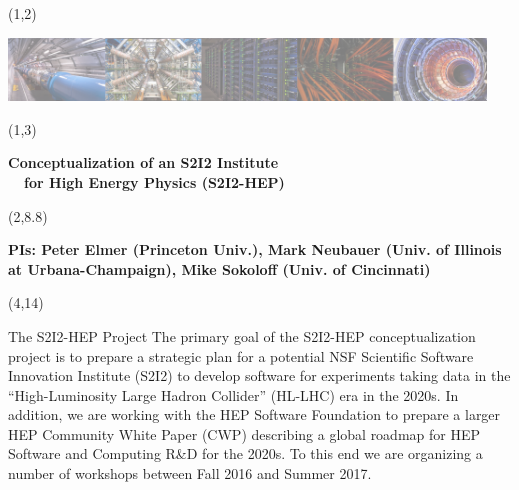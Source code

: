\documentclass[final]{beamer}
\begin{document}
\begin{frame}{} 




\begin{textblock}{84.0}(1,2)
\begin{center}
\includegraphics[width=0.95\textwidth]{images/s2i2-banner-50percent.png}
\end{center}
\end{textblock}

\begin{textblock}{84.0}(1,3)
\begin{center}
\begin{Huge}
\textbf{
Conceptualization of an S2I2 Institute \\
~~for High Energy Physics (S2I2-HEP)
}
\end{Huge}
\end{center}
\end{textblock}

\begin{textblock}{84.0}(2,8.8)
\begin{center}
\begin{Large}
\textbf{
PIs: Peter Elmer (Princeton Univ.), Mark Neubauer (Univ. of Illinois \\ 
at Urbana-Champaign), Mike Sokoloff (Univ. of Cincinnati)
}
\end{Large}
\end{center}
\end{textblock}

\begin{textblock}{78.0}(4,14)
\begin{block}{The S2I2-HEP Project}
The primary goal of the S2I2-HEP conceptualization project is to
prepare a strategic plan for a potential NSF Scientific Software
Innovation Institute (S2I2) to develop software for experiments
taking data in the ``High-Luminosity Large Hadron Collider'' (HL-LHC)
era in the 2020s. In addition, we are working with the HEP Software
Foundation to prepare a larger HEP Community White Paper (CWP)
describing a global roadmap for HEP Software and Computing R\&D for
the 2020s. To this end we are organizing a number of workshops
between Fall 2016 and Summer 2017.
\end{block}
\end{textblock}


\end{frame}
\end{document}
